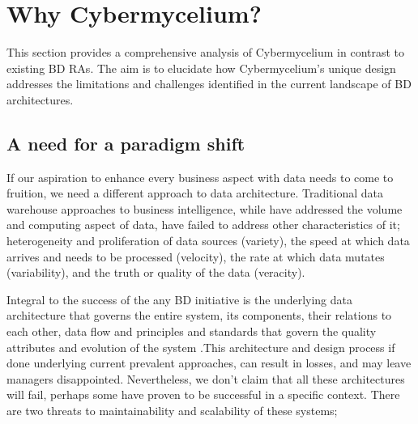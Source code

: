\documentclass[review]{elsarticle}
\begin{document}
\section{Why Cybermycelium?} \label{theory-section}

This section provides a comprehensive analysis of Cybermycelium in contrast to existing BD RAs. The aim is to elucidate how Cybermycelium's unique design addresses the limitations and challenges identified in the current landscape of BD architectures.





\subsection{A need for a paradigm shift} \label{need for paradigm shift}

If our aspiration to enhance every business aspect with data needs to come to fruition, we need a different approach to data architecture. Traditional data warehouse approaches to business intelligence, while have addressed the volume and computing aspect of data, have failed to address other characteristics of it; heterogeneity and proliferation of data sources (variety), the speed at which data arrives and needs to be processed (velocity), the rate at which data mutates (variability), and the truth or quality of the data (veracity).

Integral to the success of the any BD initiative is the underlying data architecture that governs the entire system, its components, their relations to each other, data flow and principles and standards that govern the quality attributes and evolution of the system \cite{DecipheringDataArchitectures}.This architecture and design process if done underlying current prevalent approaches, can result in losses, and may leave managers disappointed. Nevertheless, we don't claim that all these architectures will fail, perhaps some have proven to be successful in a specific context. There are two threats to maintainability and scalability of these systems;
\end{document}
